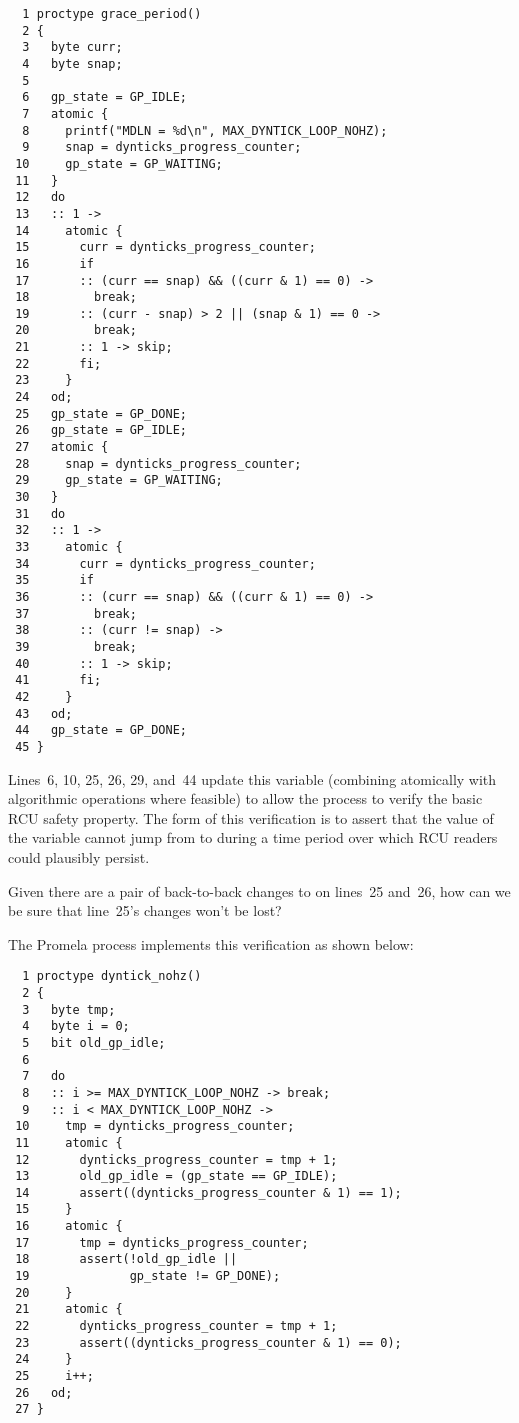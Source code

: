 { \scriptsize
\begin{verbatim}
  1 proctype grace_period()
  2 {
  3   byte curr;
  4   byte snap;
  5
  6   gp_state = GP_IDLE;
  7   atomic {
  8     printf("MDLN = %d\n", MAX_DYNTICK_LOOP_NOHZ);
  9     snap = dynticks_progress_counter;
 10     gp_state = GP_WAITING;
 11   }
 12   do
 13   :: 1 ->
 14     atomic {
 15       curr = dynticks_progress_counter;
 16       if
 17       :: (curr == snap) && ((curr & 1) == 0) ->
 18         break;
 19       :: (curr - snap) > 2 || (snap & 1) == 0 ->
 20         break;
 21       :: 1 -> skip;
 22       fi;
 23     }
 24   od;
 25   gp_state = GP_DONE;
 26   gp_state = GP_IDLE;
 27   atomic {
 28     snap = dynticks_progress_counter;
 29     gp_state = GP_WAITING;
 30   }
 31   do
 32   :: 1 ->
 33     atomic {
 34       curr = dynticks_progress_counter;
 35       if
 36       :: (curr == snap) && ((curr & 1) == 0) ->
 37         break;
 38       :: (curr != snap) ->
 39         break;
 40       :: 1 -> skip;
 41       fi;
 42     }
 43   od;
 44   gp_state = GP_DONE;
 45 }
\end{verbatim}
}

Lines~6, 10, 25, 26, 29, and~44 update this variable (combining
atomically with algorithmic operations where feasible) to
allow the  process to verify the basic
RCU safety property.
The form of this verification is to assert that the value of the
 variable cannot jump from
 to  during a time period
over which RCU readers could plausibly persist.

\QuickQuiz{}
	Given there are a pair of back-to-back changes to
	 on lines~25 and~26,
	how can we be sure that line~25's changes won't be lost?
 \QuickQuizEnd

The  Promela process implements
this verification as shown below:

{ \scriptsize
\begin{verbatim}
  1 proctype dyntick_nohz()
  2 {
  3   byte tmp;
  4   byte i = 0;
  5   bit old_gp_idle;
  6
  7   do
  8   :: i >= MAX_DYNTICK_LOOP_NOHZ -> break;
  9   :: i < MAX_DYNTICK_LOOP_NOHZ ->
 10     tmp = dynticks_progress_counter;
 11     atomic {
 12       dynticks_progress_counter = tmp + 1;
 13       old_gp_idle = (gp_state == GP_IDLE);
 14       assert((dynticks_progress_counter & 1) == 1);
 15     }
 16     atomic {
 17       tmp = dynticks_progress_counter;
 18       assert(!old_gp_idle ||
 19              gp_state != GP_DONE);
 20     }
 21     atomic {
 22       dynticks_progress_counter = tmp + 1;
 23       assert((dynticks_progress_counter & 1) == 0);
 24     }
 25     i++;
 26   od;
 27 }
\end{verbatim}
}

